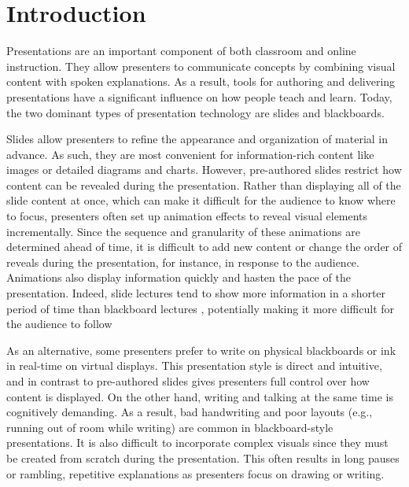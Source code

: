 \section{Introduction}

Presentations are an important component of both classroom and online instruction. 
%
They allow presenters to communicate concepts by combining visual content with spoken explanations.
%
As a result, tools for authoring and delivering presentations have a significant influence on how people teach and learn.
%
Today, the two dominant types of presentation technology are slides and blackboards.


Slides allow presenters to refine the appearance and organization of material in advance. As such, they are most convenient for information-rich content like images or detailed diagrams and charts. 
%
However, pre-authored slides restrict how content can be revealed during the presentation. Rather than displaying all of the slide content at once, which can make it difficult for the audience to know where to focus, presenters often set up animation effects to reveal visual elements incrementally. Since the sequence and granularity of these animations are determined ahead of time, it is difficult to add new content or change the order of reveals during the presentation, for instance, in response to the audience.
%
Animations also display information quickly and hasten the pace of the presentation. Indeed, slide lectures tend to show more information in a shorter period of time than blackboard lectures \cite{lanir2008observing}, potentially making it more difficult for the audience to follow %

As an alternative, some presenters prefer to write on physical blackboards or ink in real-time on virtual displays. This presentation style is direct and intuitive, and in contrast to pre-authored slides gives presenters full control over how content is displayed.
%
On the other hand, writing and talking at the same time is cognitively demanding. As a result, bad handwriting and poor layouts (e.g., running out of room while writing) are common in blackboard-style presentations. It is also difficult to incorporate complex visuals since they must be created from scratch during the presentation. This often results in long pauses or rambling, repetitive explanations as presenters focus on drawing or writing.

